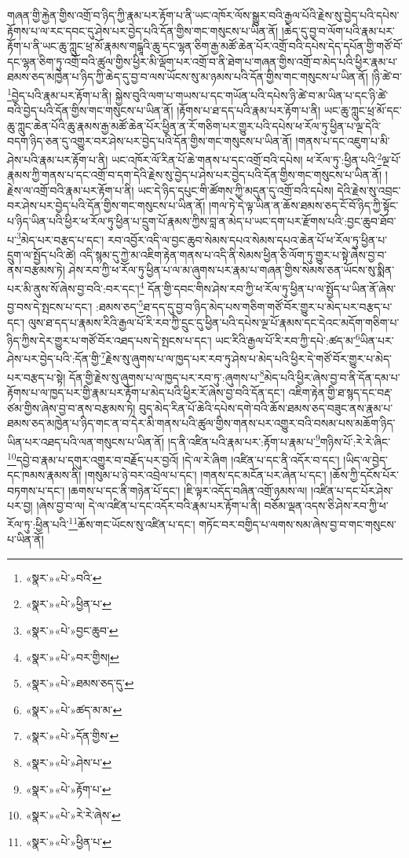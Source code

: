 གཞན་གྱི་རྐྱེན་གྱིས་འགྲོ་བ་ཉིད་ཀྱི་རྣམ་པར་རྟོག་པ་ནི་ཡང་འཁོར་ལོས་སྒྱུར་བའི་རྒྱལ་པོའི་རྗེས་སུ་བྱེད་པའི་དཔེས་རྟོགས་པ་ལ་རང་དབང་དུ་ཤེས་པར་བྱེད་པའི་དོན་གྱིས་གང་གསུངས་པ་ཡིན་ནོ། །ཆེད་དུ་བྱ་བ་ལོག་པའི་རྣམ་པར་རྟོག་པ་ནི་ཡང་ཆུ་ཀླུང་ཕྲ་མོ་རྣམས་གངྒཱའི་ཆུ་དང་ལྷན་ཅིག་རྒྱ་མཚོ་ཆེན་པོར་འགྲོ་བའི་དཔེས་དེད་དཔོན་གྱི་གཙོ་བོ་དང་ལྷན་ཅིག་ཏུ་འགྲོ་བའི་ཚུལ་གྱིས་ཕྱིར་མི་ལྡོག་པར་འགྲོ་བ་ནི་ཐེག་པ་གཞན་གྱིས་འགྲོ་བ་མེད་པའི་ཕྱིར་རྣམ་པ་ཐམས་ཅད་མཁྱེན་པ་ཉིད་ཀྱི་ཆེད་དུ་བྱ་བ་ལས་ཡོངས་སུ་མ་ཉམས་པའི་དོན་གྱིས་གང་གསུངས་པ་ཡིན་ནོ། །ཉི་ཚེ་བ་\footnote{«སྣར་»«པེ་»བའི་}བྱེད་པའི་རྣམ་པར་རྟོག་པ་ནི། སྐྱེས་བུའི་ལག་པ་གཡས་པ་དང་གཡོན་པའི་དཔེས་ཉི་ཚེ་བ་མ་ཡིན་པ་དང་ཉི་ཚེ་བའི་བྱེད་པའི་དོན་གྱིས་གང་གསུངས་པ་ཡིན་ནོ། །རྟོགས་པ་ཐ་དད་པའི་རྣམ་པར་རྟོག་པ་ནི། ཡང་ཆུ་ཀླུང་ཕྲ་མོ་དང་ཆུ་ཀླུང་ཆེན་པོའི་ཆུ་རྣམས་རྒྱ་མཚོ་ཆེན་པོར་ཕྱིན་ན་རོ་གཅིག་པར་གྱུར་པའི་དཔེས་ཕ་རོལ་ཏུ་ཕྱིན་པ་ལྔ་དེའི་བདག་ཉིད་ཅན་དུ་འགྱུར་བར་ཤེས་པར་བྱེད་པའི་དོན་གྱིས་གང་གསུངས་པ་ཡིན་ནོ། །གནས་པ་དང་འཇུག་པ་མི་ཤེས་པའི་རྣམ་པར་རྟོག་པ་ནི། ཡང་འཁོར་ལོ་རིན་པོ་ཆེ་གནས་པ་དང་འགྲོ་བའི་དཔེས། ཕ་རོལ་ཏུ་:ཕྱིན་པའི་\footnote{«སྣར་»«པེ་»ཕྱིན་པ་}ལྔ་པོ་རྣམས་ཀྱི་གནས་པ་དང་འགྲོ་བ་དག་དེའི་རྗེས་སུ་བྱེད་པ་ཤེས་པར་བྱེད་པའི་དོན་གྱིས་གང་གསུངས་པ་ཡིན་ནོ། །རྗེས་ལ་འགྲོ་བའི་རྣམ་པར་རྟོག་པ་ནི། ཡང་དེ་ཉིད་དཔུང་གི་ཚོགས་ཀྱི་མདུན་དུ་འགྲོ་བའི་དཔེས། དེའི་རྗེས་སུ་འབྲང་བར་ཤེས་པར་བྱེད་པའི་དོན་གྱིས་གང་གསུངས་པ་ཡིན་ནོ། །གལ་ཏེ་དེ་ལྟ་ཡིན་ན་ཆོས་ཐམས་ཅད་ངོ་བོ་ཉིད་ཀྱི་སྟོང་པ་ཉིད་ཡིན་པའི་ཕྱིར་ཕ་རོལ་ཏུ་ཕྱིན་པ་དྲུག་པོ་རྣམས་ཀྱིས་བླ་ན་མེད་པ་ཡང་དག་པར་རྫོགས་པའི་:བྱང་ཆུབ་ཐོབ་པ་\footnote{«སྣར་»«པེ་»བྱང་ཆུབ་}མེད་པར་བརྩད་པ་དང་། རབ་འབྱོར་འདི་ལ་བྱང་ཆུབ་སེམས་དཔའ་སེམས་དཔའ་ཆེན་པོ་ཕ་རོལ་ཏུ་ཕྱིན་པ་དྲུག་ལ་སྤྱོད་པའི་ཚེ། འདི་སྙམ་དུ་ཀྱེ་མ་འཇིག་རྟེན་གནས་པ་འདི་ནི་སེམས་ཕྱིན་ཅི་ལོག་ཏུ་གྱུར་པ་སྟེ་ཞེས་བྱ་བ་ནས་བརྩམས་ཏེ། ཤེས་རབ་ཀྱི་ཕ་རོལ་ཏུ་ཕྱིན་པ་ལ་མ་ཞུགས་པར་རྣམ་པ་གཞན་གྱིས་སེམས་ཅན་ཡོངས་སུ་སྨིན་པར་མི་ནུས་སོ་ཞེས་བྱ་བའི་:བར་དང་།\footnote{«སྣར་»«པེ་»བར་གྱིས།} དོན་གྱི་དབང་གིས་ཤེས་རབ་ཀྱི་ཕ་རོལ་ཏུ་ཕྱིན་པ་ལ་སྤྱོད་པ་ཡིན་ནོ་ཞེས་བྱ་བས་དེ་སྤངས་པ་དང་། :ཐམས་ཅད་\footnote{«སྣར་»«པེ་»ཐམས་ཅད་དུ་}ཐ་དད་དུ་བྱ་བ་ཉིད་མེད་པས་གཅིག་གཙོ་བོར་གྱུར་པ་མེད་པར་བརྩད་པ་དང་། ལུས་ཐ་དད་པ་རྣམས་རིའི་རྒྱལ་པོ་རི་རབ་ཀྱི་དྲུང་དུ་ཕྱིན་པའི་དཔེས་ལྔ་པོ་རྣམས་དང་དེའང་མདོག་གཅིག་པ་ཉིད་ཀྱིས་དེར་གྱུར་པ་གཙོ་བོར་འཐད་པས་དེ་སྤངས་པ་དང་། ཡང་རིའི་རྒྱལ་པོ་རི་རབ་ཀྱི་དཔེ་:ཚད་མ་\footnote{«སྣར་»«པེ་»ཚད་མ་མ་}ཡིན་པར་ཤེས་པར་བྱེད་པའི་:དོན་གྱི་\footnote{«སྣར་»«པེ་»དོན་གྱིས་}རྗེས་སུ་ཞུགས་པ་ལ་ཁྱད་པར་རབ་ཏུ་ཤེས་པ་མེད་པའི་ཕྱིར་དེ་གཙོ་བོར་གྱུར་པ་མེད་པར་བརྩད་པ་སྟེ། དོན་གྱི་རྗེས་སུ་ཞུགས་པ་ལ་ཁྱད་པར་རབ་ཏུ་:ཞུགས་པ་\footnote{«སྣར་»«པེ་»ཤེས་པ་}མེད་པའི་ཕྱིར་ཞེས་བྱ་བ་ནི་དོན་དམ་པ་རྟོགས་པ་ལ་ཁྱད་པར་གྱི་རྣམ་པར་རྟོག་པ་མེད་པའི་ཕྱིར་རོ་ཞེས་བྱ་བའི་དོན་དང་། འཇིག་རྟེན་གྱི་ཐ་སྙད་དང་བརྡ་ཙམ་གྱིས་ཞེས་བྱ་བ་ནས་བརྩམས་ཏེ། བུད་མེད་རིན་པོ་ཆེའི་དཔེས་དགེ་བའི་ཆོས་ཐམས་ཅད་བཟུང་ནས་རྣམ་པ་ཐམས་ཅད་མཁྱེན་པ་ཉིད་གང་ན་བ་དེར་མི་གནས་པའི་ཚུལ་གྱིས་གནས་པར་འགྱུར་བའི་བསམ་པས་མཆོག་ཉིད་ཡིན་པར་འཐད་པའི་ལན་གསུངས་པ་ཡིན་ནོ། །ད་ནི་འཛིན་པའི་རྣམ་པར་:རྟོག་པ་རྣམ་པ་\footnote{«སྣར་»«པེ་»རྟོག་པ་}གཉིས་པོ་:རེ་རེ་ཞིང་\footnote{«སྣར་»«པེ་»རེ་རེ་ཞེས་}དབྱེ་བ་རྣམ་པ་དགུར་འགྱུར་བ་བརྗོད་པར་བྱའོ། །དེ་ལ་རེ་ཞིག །འཛིན་པ་དང་ནི་འདོར་བ་དང་། །ཡིད་ལ་བྱེད་དང་ཁམས་རྣམས་ནི། །གསུམ་པ་ཉེ་བར་འབྲེལ་པ་དང་། །གནས་དང་མངོན་པར་ཞེན་པ་དང་། །ཆོས་ཀྱི་དངོས་པོར་བཏགས་པ་དང་། །ཆགས་པ་དང་ནི་གཉེན་པོ་དང་། །ཇི་ལྟར་འདོད་བཞིན་འགྲོ་ཉམས་ལ། །འཛིན་པ་དང་པོར་ཤེས་པར་བྱ། །ཞེས་བྱ་བ་ལ། དེ་ལ་འཛིན་པ་དང་འདོར་བའི་རྣམ་པར་རྟོག་པ་ནི། བཅོམ་ལྡན་འདས་ཅི་ཤེས་རབ་ཀྱི་ཕ་རོལ་ཏུ་:ཕྱིན་པའི་\footnote{«སྣར་»«པེ་»ཕྱིན་པ་}ཆོས་གང་ཡོངས་སུ་འཛིན་པ་དང་། གཏོང་བར་བགྱིད་པ་ལགས་སམ་ཞེས་བྱ་བ་གང་གསུངས་པ་ཡིན་ནོ། 